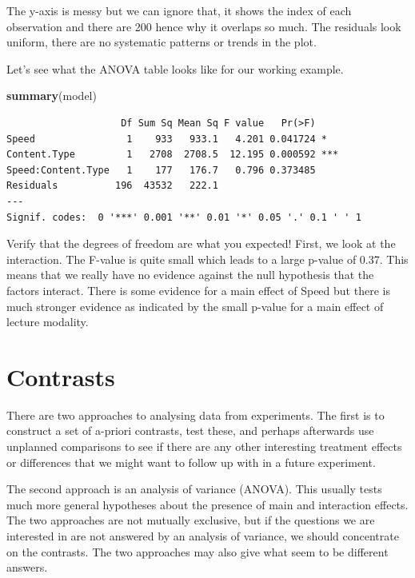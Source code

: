 \documentclass[
  letterpaper,
]{book}
\newenvironment{Shaded}{\begin{snugshade}}{\end{snugshade}}
\newcommand{\FunctionTok}[1]{\textcolor[rgb]{0.13,0.29,0.53}{\textbf{#1}}}
\newcommand{\NormalTok}[1]{#1}
\begin{document}
The y-axis is messy but we can ignore that, it shows the index of each
observation and there are 200 hence why it overlaps so much. The
residuals look uniform, there are no systematic patterns or trends in
the plot.

Let's see what the ANOVA table looks like for our working example.

\begin{Shaded}
\begin{Highlighting}[]
\FunctionTok{summary}\NormalTok{(model)}
\end{Highlighting}
\end{Shaded}

\begin{verbatim}
                    Df Sum Sq Mean Sq F value   Pr(>F)    
Speed                1    933   933.1   4.201 0.041724 *  
Content.Type         1   2708  2708.5  12.195 0.000592 ***
Speed:Content.Type   1    177   176.7   0.796 0.373485    
Residuals          196  43532   222.1                     
---
Signif. codes:  0 '***' 0.001 '**' 0.01 '*' 0.05 '.' 0.1 ' ' 1
\end{verbatim}

Verify that the degrees of freedom are what you expected! First, we look
at the interaction. The F-value is quite small which leads to a large
p-value of 0.37. This means that we really have no evidence against the
null hypothesis that the factors interact. There is some evidence for a
main effect of Speed but there is much stronger evidence as indicated by
the small p-value for a main effect of lecture modality.

\chapter{Contrasts}\label{contrasts-2}

There are two approaches to analysing data from experiments. The first
is to construct a set of a-priori contrasts, test these, and perhaps
afterwards use unplanned comparisons to see if there are any other
interesting treatment effects or differences that we might want to
follow up with in a future experiment.

The second approach is an analysis of variance (ANOVA). This usually
tests much more general hypotheses about the presence of main and
interaction effects. The two approaches are not mutually exclusive, but
if the questions we are interested in are not answered by an analysis of
variance, we should concentrate on the contrasts. The two approaches may
also give what seem to be different answers.
\end{document}
